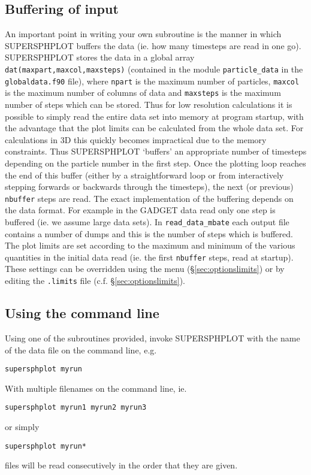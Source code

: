 \documentclass[a4paper,12pt]{article}
\begin{document}
\subsection{Buffering of input}
 An important point in writing your own subroutine is the manner in which
SUPERSPHPLOT buffers the data (ie. how many timesteps are read in one go).
SUPERSPHPLOT stores the data in a global array \verb+dat(maxpart,maxcol,maxsteps)+ (contained in
the module \verb+particle_data+ in the \verb+globaldata.f90+ file), where
\verb+npart+ is the maximum number of particles, \verb+maxcol+ is the maximum
number of columns of data and \verb+maxsteps+ is the maximum number of steps
which can be stored. Thus for low resolution calculations it is possible to
simply read the entire data set into memory at program startup, with the
advantage that the plot limits can be calculated from the whole data set. For
calculations in 3D this quickly becomes impractical due to the memory
constraints. Thus SUPERSPHPLOT `buffers' an appropriate number of timesteps depending on the
particle number in the first step. Once the plotting loop reaches the end of
this buffer (either by a straightforward loop or from interactively stepping
forwards or backwards through the timesteps), the next (or previous)
\verb+nbuffer+ steps are read. The exact implementation of the buffering depends
on the data format. For example in the GADGET data read only one step is
buffered (ie. we assume large data sets). In \verb+read_data_mbate+ each output
file contains a number of dumps and this is the number of steps which is
buffered. The plot limits are set according to the maximum and minimum of the
various quantities in the initial data read (ie. the first \verb+nbuffer+ steps,
read at startup). These settings can be overridden using the menu
(\S\vref{sec:optionslimits}) or by editing
the \verb+.limits+ file (c.f. \S\ref{sec:optionslimits}).

\subsection{Using the command line}
\label{sec:commandline}
 Using one of the subroutines provided, invoke SUPERSPHPLOT with the name of the data
file on the command line, e.g.
\begin{verbatim}
supersphplot myrun
\end{verbatim}
With multiple filenames on the command line, ie.
\begin{verbatim}
supersphplot myrun1 myrun2 myrun3
\end{verbatim}
or simply
\begin{verbatim}
supersphplot myrun*
\end{verbatim}
files will be read consecutively in the order that they are given.
\end{document}
